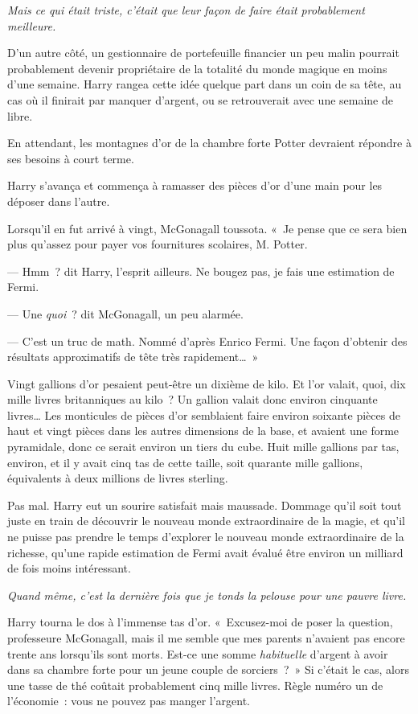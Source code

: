 \emph{Mais ce qui était triste, c'était que leur façon de faire était probablement meilleure.}

D'un autre côté, un gestionnaire de portefeuille financier un peu malin pourrait probablement devenir propriétaire de la totalité du monde magique en moins d'une semaine. Harry rangea cette idée quelque part dans un coin de sa tête, au cas où il finirait par manquer d'argent, ou se retrouverait avec une semaine de libre.

En attendant, les montagnes d'or de la chambre forte Potter devraient répondre à ses besoins à court terme.

Harry s'avança et commença à ramasser des pièces d'or d'une main pour les déposer dans l'autre.

Lorsqu'il en fut arrivé à vingt, McGonagall toussota.  «~Je pense que ce sera bien plus qu'assez pour payer vos fournitures scolaires, M. Potter.

--- Hmm~? dit Harry, l'esprit ailleurs. Ne bougez pas, je fais une estimation de Fermi.

--- Une \emph{quoi}~? dit McGonagall, un peu alarmée.

--- C'est un truc de math. Nommé d'après Enrico Fermi. Une façon d'obtenir des résultats approximatifs de tête très rapidement…~»

Vingt gallions d'or pesaient peut-être un dixième de kilo. Et l'or valait, quoi, dix mille livres britanniques au kilo~? Un gallion valait donc environ cinquante livres… Les monticules de pièces d'or semblaient faire environ soixante pièces de haut et vingt pièces dans les autres dimensions de la base, et avaient une forme pyramidale, donc ce serait environ un tiers du cube. Huit mille gallions par tas, environ, et il y avait cinq tas de cette taille, soit quarante mille gallions, équivalents à deux millions de livres sterling.

Pas mal. Harry eut un sourire satisfait mais maussade. Dommage qu'il soit tout juste en train de découvrir le nouveau monde extraordinaire de la magie, et qu'il ne puisse pas prendre le temps d'explorer le nouveau monde extraordinaire de la richesse, qu'une rapide estimation de Fermi avait évalué être environ un milliard de fois moins intéressant.

\emph{Quand même, c'est la dernière fois que je tonds la pelouse pour une pauvre livre.}

Harry tourna le dos à l'immense tas d'or. «~Excusez-moi de poser la question, professeure McGonagall, mais il me semble que mes parents n'avaient pas encore trente ans lorsqu'ils sont morts. Est-ce une somme \emph{habituelle} d'argent à avoir dans sa chambre forte pour un jeune couple de sorciers~?~» Si c'était le cas, alors une tasse de thé coûtait probablement cinq mille livres.  Règle numéro un de l'économie~: vous ne pouvez pas manger l'argent.

